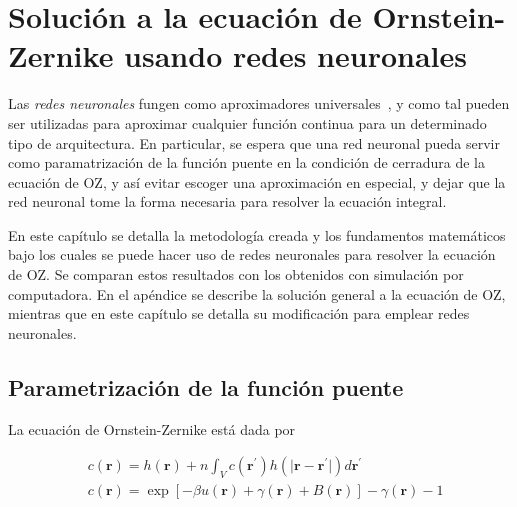 \newcommand{\vecr}{\mathbf{r}}
\newcommand{\veck}{\mathbf{k}}
\newcommand{\nnet}{N_{\theta}(\mathbf{r})}
\chapter{Solución a la ecuación de Ornstein-Zernike usando redes neuronales} %

\label{Cap3} %


Las \emph{redes neuronales} fungen como aproximadores universales~\cite{hornikMultilayerFeedforwardNetworks1989, hornikApproximationCapabilitiesMultilayer1991, cybenkoApproximationSuperpositionsSigmoidal1989},
y como tal pueden ser utilizadas para aproximar cualquier función continua para un determinado tipo de arquitectura.
En particular, se espera que una red neuronal pueda servir como paramatrización de la
función puente en la condición de cerradura de la ecuación de OZ, y así evitar escoger
una aproximación en especial, y dejar que la red neuronal tome la forma necesaria
para resolver la ecuación integral.

En este capítulo se detalla la metodología creada y los fundamentos matemáticos bajo los
cuales se puede hacer uso de redes neuronales para resolver la ecuación de OZ.
Se comparan estos resultados con los obtenidos con simulación por computadora.
En el apéndice se describe la solución general a la ecuación de OZ, mientras que
en este capítulo se detalla su modificación para emplear redes neuronales.

\section{Parametrización de la función puente}

La ecuación de Ornstein-Zernike está dada por

\begin{subequations}
    \begin{align*}
         & c(\vecr) = h(\vecr) +
        n \int_{V}
        c(\vecr^{\prime})
        h(\lvert \vecr - \vecr^{\prime} \rvert)
        d\vecr^{\prime} \label{eq:oz1} \\
         & c(\vecr)
        = \exp{\left[
                -  \beta u(\vecr)
                +  \gamma(\vecr)
                + B(\vecr)
                \right]} -
        \gamma(\vecr)
        - 1
    \end{align*}
\end{subequations}

